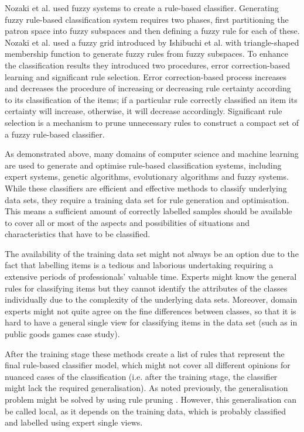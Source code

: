 Nozaki et al. \cite{Nozaki1996}used fuzzy systems to create a rule-based classifier. Generating fuzzy rule-based classification system requires two phases, first partitioning the patron space into fuzzy subspaces and then defining a fuzzy rule for each of these. Nozaki et al. used a fuzzy grid introduced by Ishibuchi et al. \cite{Ishibuchi1992} with triangle-shaped membership function to generate fuzzy rules from fuzzy subspaces. To enhance the classification results they introduced two procedures, error correction-based learning and significant rule selection. Error correction-based process increases and decreases the procedure of increasing or decreasing rule certainty according to its classification of the items; if a particular rule correctly classified an item its certainty will increase, otherwise, it will decrease accordingly. Significant rule selection is a mechanism to prune unnecessary rules to construct a compact set of a fuzzy rule-based classifier.

As demonstrated above, many domains of computer science and machine learning are used to generate and optimise rule-based classification systems, including expert systems, genetic algorithms, evolutionary algorithms and fuzzy systems. While these classifiers are efficient and effective methods to classify underlying data sets, they require a training data set for rule generation and optimisation. This means a sufficient amount of correctly labelled samples should be available to cover all or most of the aspects and possibilities of situations and characteristics that have to be classified.

The availability of the training data set might not always be an option due to the fact that labelling items is a tedious and laborious undertaking requiring a extensive periods of professionals' valuable time. Experts might know the general rules for classifying items but they cannot identify the attributes of the classes individually due to the complexity of the underlying data sets. Moreover, domain experts might not quite agree on the fine differences between classes, so that it is hard to have a general single view for classifying items in the data set (such as in public goods games case study).

After the training stage these methods create a list of rules that represent the final rule-based classifier model, which might not cover all different opinions for nuanced cases of the classification (i.e. after the training stage, the classifier might lack the required generalisation). As noted previously, the generalisation problem might be solved by using rule pruning \cite{Nozaki1996}. However, this generalisation can be called local, as it depends on the training data, which is probably classified and labelled using expert single views.

